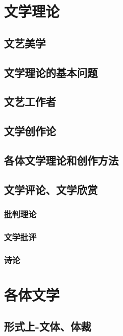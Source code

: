 \documentclass[UTF8]{../../RepresentationUniverse}
\begin{document}
\chapter{文学理论}


\section{文艺美学}
\section{文学理论的基本问题}
\section{文艺工作者}
\section{文学创作论}
\section{各体文学理论和创作方法}
\section{文学评论、文学欣赏}
    \subsection{批判理论}
    \subsection{文学批评}
    \subsection{诗论}







 





\chapter{各体文学}

\section{形式上-文体、体裁}
\end{document}
